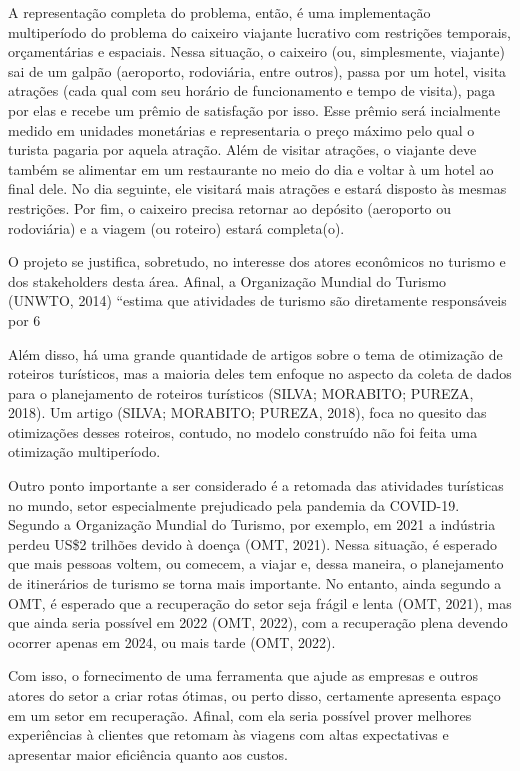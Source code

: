 A representação completa do problema, então, é uma implementação multiperíodo do problema do caixeiro viajante lucrativo com restrições temporais, orçamentárias e espaciais. Nessa situação, o caixeiro (ou, simplesmente, viajante) sai de um galpão (aeroporto, rodoviária, entre outros), passa por um hotel, visita atrações (cada qual com seu horário de funcionamento e tempo de visita), paga por elas e recebe um prêmio de satisfação por isso. Esse prêmio será incialmente medido em unidades monetárias e representaria o preço máximo pelo qual o turista pagaria por aquela atração. Além de visitar atrações, o viajante deve também se alimentar em um restaurante no meio do dia e voltar à um hotel ao final dele. No dia seguinte, ele visitará mais atrações e estará disposto às mesmas restrições. Por fim, o caixeiro precisa retornar ao depósito (aeroporto ou rodoviária) e a viagem (ou roteiro) estará completa(o).

O projeto se justifica, sobretudo, no interesse dos atores econômicos no turismo e dos stakeholders desta área. Afinal, a Organização Mundial do Turismo (UNWTO, 2014) “estima que atividades de turismo são diretamente responsáveis por 6%

Além disso, há uma grande quantidade de artigos sobre o tema de otimização de roteiros turísticos, mas a maioria deles tem enfoque no aspecto da coleta de dados para o planejamento de roteiros turísticos (SILVA; MORABITO; PUREZA, 2018). Um artigo (SILVA; MORABITO; PUREZA, 2018), foca no quesito das otimizações desses roteiros, contudo, no modelo construído não foi feita uma otimização multiperíodo.

Outro ponto importante a ser considerado é a retomada das atividades turísticas no mundo, setor especialmente prejudicado pela pandemia da COVID-19. Segundo a Organização Mundial do Turismo, por exemplo, em 2021 a indústria perdeu US\$2 trilhões devido à doença (OMT, 2021). Nessa situação, é esperado que mais pessoas voltem, ou comecem, a viajar e, dessa maneira, o planejamento de itinerários de turismo se torna mais importante. No entanto, ainda segundo a OMT, é esperado que a recuperação do setor seja frágil e lenta (OMT, 2021), mas que ainda seria possível em 2022 (OMT, 2022), com a recuperação plena devendo ocorrer apenas em 2024, ou mais tarde (OMT, 2022).

Com isso, o fornecimento de uma ferramenta que ajude as empresas e outros atores do setor a criar rotas ótimas, ou perto disso, certamente apresenta espaço em um setor em recuperação. Afinal, com ela seria possível prover melhores experiências à clientes que retomam às viagens com altas expectativas e apresentar maior eficiência quanto aos custos. 

